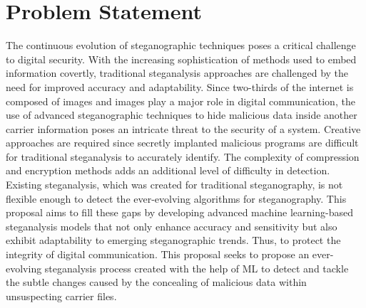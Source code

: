 \section{Problem Statement}
The continuous evolution of steganographic techniques poses a critical challenge to digital security. With the increasing sophistication of methods used to embed information covertly, traditional steganalysis approaches are challenged by the need for improved accuracy and adaptability. Since two-thirds of the internet is composed of images and images play a major role in digital communication, the use of advanced steganographic techniques to hide malicious data inside another carrier information poses an intricate threat to the security of a system. Creative approaches are required since secretly implanted malicious programs are difficult for traditional steganalysis to accurately identify. The complexity of compression and encryption methods adds an additional level of difficulty in detection. Existing steganalysis, which was created for traditional steganography, is not flexible enough to detect the ever-evolving algorithms for steganography. This proposal aims to fill these gaps by developing advanced machine learning-based steganalysis models that not only enhance accuracy and sensitivity but also exhibit adaptability to emerging steganographic trends. Thus, to protect the integrity of digital communication. This proposal seeks to propose an ever-evolving steganalysis process created with the help of ML to detect and tackle the subtle changes caused by the concealing of malicious data within unsuspecting carrier files.
\clearpage
